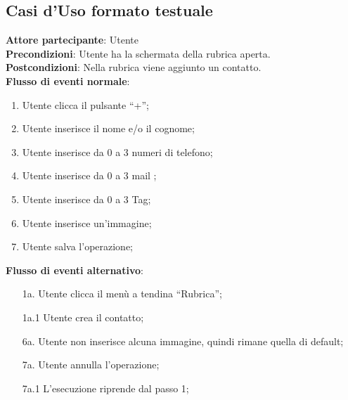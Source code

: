 \newpage
\subsection{Casi d'Uso formato testuale}
\begin{tcolorbox}[colback=white,colframe=black!80!white,title=\textbf{C1 - Aggiungere contatto}]
\textbf{Attore partecipante}: Utente
\\\textbf{Precondizioni}: Utente ha la schermata della rubrica aperta.
\\\textbf{Postcondizioni}: Nella rubrica viene aggiunto un contatto.
\\\textbf{Flusso di eventi normale}:
\begin{enumerate}[noitemsep, topsep=0pt]
\item Utente clicca il pulsante “+”;
\item Utente inserisce il nome e/o il cognome;
\item Utente inserisce da 0 a 3 numeri di telefono;
\item 	Utente inserisce da 0 a 3 mail ;
\item 	Utente inserisce da 0 a 3 Tag;
\item 	Utente inserisce un’immagine;
\item 	Utente salva l’operazione;
\end{enumerate}
\textbf{Flusso di eventi alternativo}:
\begin{itemize}[noitemsep, topsep=0pt]
	\item[1a. ] Utente clicca il menù a tendina “Rubrica”;
	\item[1a.1] Utente crea il contatto;
	\item[6a. ] Utente non inserisce alcuna immagine, quindi rimane quella di default;
	\item[7a. ] Utente annulla l’operazione;
	\item[7a.1] L’esecuzione riprende dal passo 1;
\end{itemize}
\end{tcolorbox}


